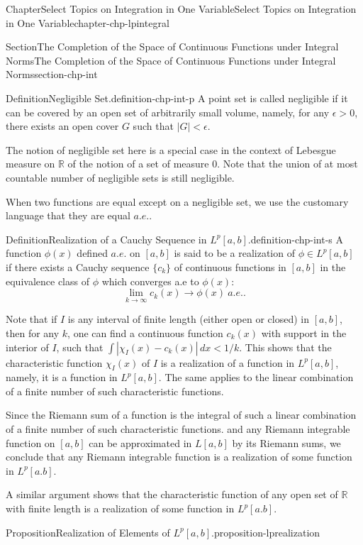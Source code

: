 \documentclass[oneside,10pt,]{book}
\numberwithin{equation}{section}
\newcommand{\bbR}{\mathbb{R}}
\begin{document}
\begin{chapterptx}{Chapter}{Select Topics on Integration in One Variable}{}{Select Topics on Integration in One Variable}{}{}{chapter-chp-lpintegral}
\begin{sectionptx}{Section}{The Completion of the Space of Continuous Functions under Integral Norms}{}{The Completion of the Space of Continuous Functions under Integral Norms}{}{}{section-chp-int}
\begin{definition}{Definition}{Negligible Set.}{definition-chp-int-p}%
A point set is called negligible if it can be covered by an open set of arbitrarily small volume, namely, for any \(\epsilon > 0\), there exists an open cover \(G\) such that \(|G| < \epsilon\).%
\end{definition}
The notion of negligible set here is a special case in the context of Lebesgue measure on \(\bbR\) of the notion of a set of measure \(0\). Note that the union of at most countable number of negligible sets is still negligible.%
\par
When two functions are equal  except on a negligible set, we use the customary language that they are equal \(a.e.\).%
\begin{definition}{Definition}{Realization of a Cauchy Sequence in \(L^{p}[a, b]\).}{definition-chp-int-s}%
A function \(\phi (x)\) defined \(a.e.\) on \([a,  b]\) is said to be a realization of \(\phi \in L^{p}[a, b]\) if there exists a Cauchy sequence \(\{c_{k}\}\) of continuous functions in \([a, b]\) in the equivalence class of \(\phi\) which converges a.e to \(\phi (x)\):%
\begin{equation*}
\lim_{k\to \infty} c_{k}(x)\to \phi (x) \ a.e..
\end{equation*}
%
\end{definition}
Note that if \(I\) is any interval of finite length (either open or closed) in \([a, b]\), then for any \(k\), one can find a continuous function \(c_{k}(x)\) with support in the interior of \(I\), such that \(\int |\chi_{I}(x)-c_{k}(x)|\, dx < 1/k\). This shows that the characteristic function \(\chi_{I}(x)\) of \(I\)  is a realization of a function in \(L^{p}[a, b]\), namely, it is a function in \(L^{p}[a, b]\). The same applies to the linear combination of  a finite number of such characteristic functions.%
\par
Since the Riemann sum of a function is the integral of such a linear combination of  a finite number of such characteristic functions. and any Riemann integrable function on \([a, b]\) can be approximated in \(L[a, b]\) by its Riemann sums, we conclude that any Riemann integrable function is a realization of some function in \(L^{p}[a. b]\).%
\par
A similar argument shows that the characteristic function of any open set of \(\mathbb R\) with finite length is a realization of some function in \(L^{p}[a. b]\).%
\begin{proposition}{Proposition}{Realization of Elements of \(L^{p}[a, b]\).}{}{proposition-lprealization}%

\end{proposition}
\end{sectionptx}
\end{chapterptx}
\end{document}
